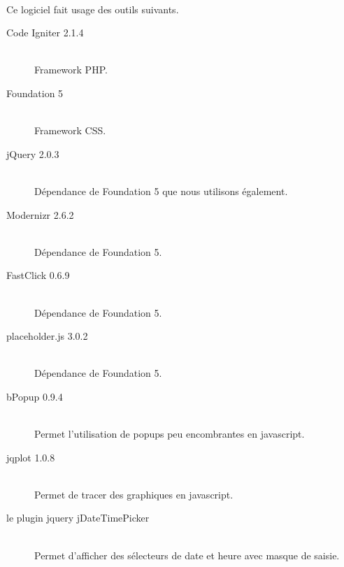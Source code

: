     \paragraph{}
        Ce logiciel fait usage des outils suivants.
        \begin{description}
            \item[Code Igniter 2.1.4]\hfill \\
                Framework PHP.
            \item[Foundation 5]\hfill \\
                Framework CSS.
            \item[jQuery 2.0.3]\hfill \\
                Dépendance de Foundation 5 que nous utilisons également.
            \item[Modernizr 2.6.2]\hfill \\
                Dépendance de Foundation 5.
            \item[FastClick 0.6.9]\hfill \\
                Dépendance de Foundation 5.
            \item[placeholder.js 3.0.2]\hfill \\
                Dépendance de Foundation 5.
            \item[bPopup 0.9.4]\hfill \\
                Permet l’utilisation de popups peu encombrantes en javascript.
            \item[jqplot 1.0.8]\hfill \\
                Permet de tracer des graphiques en javascript.
            \item[le plugin jquery jDateTimePicker]\hfill \\
                Permet d'afficher des sélecteurs de date et heure avec masque
                de saisie.
        \end{description}

